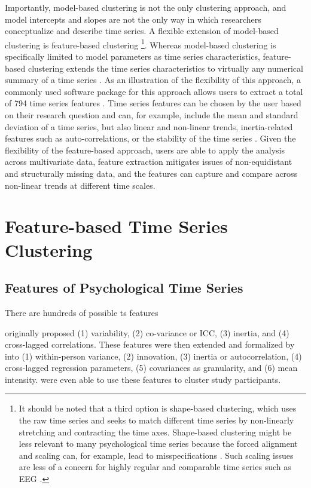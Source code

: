 \documentclass[man, 12pt, a4paper, mask, floatsintext]{apa7}
\theoremstyle{break}
\theoremstyle{plain}
\begin{document}
Importantly, model-based clustering is not the only clustering approach, and model intercepts and slopes are not the only way in which researchers conceptualize and describe time series. A flexible extension of model-based clustering is feature-based clustering \citep[e.g.,][]{Aghabozorgi2015}\footnote{It should be noted that a third option is shape-based clustering, which uses the raw time series and seeks to match different time series by non-linearly stretching and contracting the time axes. Shape-based clustering might be less relevant to many psychological time series because the forced alignment and scaling can, for example, lead to misspecifications \citep[e.g., ][]{faloutsos1994}. Such scaling issues are less of a concern for highly regular and comparable time series such as EEG \citep[][]{huang1985}.}. Whereas model-based clustering is specifically limited to model parameters as time series characteristics, feature-based clustering extends the time series characteristics to virtually any numerical summary of a time series \citep[e.g.,][]{liao2005}. As an illustration of the flexibility of this approach, a commonly used software package for this approach allows users to extract a total of 794 time series features \citep[][]{christ2018}. Time series features can be chosen by the user based on their research question and can, for example, include the mean and standard deviation of a time series, but also linear and non-linear trends, inertia-related features such as auto-correlations, or the stability of the time series \citep[e.g., mean absolute change; e.g.,][]{barandas2020}. Given the flexibility of the feature-based approach, users are able to apply the analysis across multivariate data, feature extraction mitigates issues of non-equidistant and structurally missing data, and the features can capture and compare across non-linear trends at different time scales.

\section{Feature-based Time Series Clustering}

\subsection{Features of Psychological Time Series}
There are hundreds of possible ts features 

\citet{kuppens2017} originally proposed (1) variability, (2) co-variance or ICC, (3) inertia, and (4) cross-lagged correlations. These features were then extended and formalized by \citet{krone2018} into (1) within-person variance, (2) innovation, (3) inertia or autocorrelation, (4) cross-lagged regression parameters, (5) covariances as granularity, and (6) mean intensity. \citet{krone2018} were even able to use these features to cluster study participants.
\end{document}
